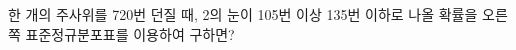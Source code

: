 \noindent\begin{minipage}[t]{0.58\linewidth}\vspace{0pt}\raggedright 한 개의 주사위를 720번 던질 때, 2의 눈이 105번 이상 135번 이하로 나올 확률을 오른쪽 표준정규분포표를 이용하여 구하면?\end{minipage}\hfill\begin{minipage}[t]{0.4\linewidth}\vspace{0pt}\centering \resizebox{\ifdim\width>\linewidth\linewidth\else\width\fi}{!}{}\end{minipage}\par
{}
